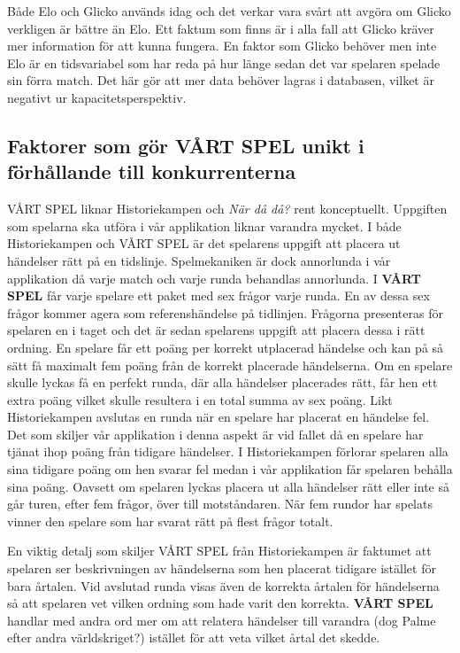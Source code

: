 \documentclass[a4paper, 11pt]{article}
\begin{document}
Både Elo och Glicko används idag och det verkar vara svårt att avgöra om Glicko verkligen är bättre än Elo\cite{stackchess}. Ett faktum som finns är i alla fall att Glicko kräver mer information för att kunna fungera. En faktor som Glicko behöver men inte Elo är en tidsvariabel som har reda på hur länge sedan det var spelaren spelade sin förra match\cite{glickoex}. Det här gör att mer data behöver lagras i databasen, vilket är negativt ur kapacitetsperspektiv.

\subsection{Faktorer som gör VÅRT SPEL unikt i förhållande till konkurrenterna}
VÅRT SPEL liknar Historiekampen och \textit{När då då?} rent konceptuellt. Uppgiften som spelarna ska utföra i vår applikation liknar varandra mycket. I både Historiekampen och VÅRT SPEL är det spelarens uppgift att placera ut händelser rätt på en tidslinje. Spelmekaniken är dock annorlunda i vår applikation då varje match och varje runda behandlas annorlunda. I \textbf{VÅRT SPEL} får varje spelare ett paket med sex frågor varje runda. En av dessa sex frågor kommer agera som referenshändelse på tidlinjen. Frågorna presenteras för spelaren en i taget och det är sedan spelarens uppgift att placera dessa i rätt ordning. En spelare får ett poäng per korrekt utplacerad händelse och kan på så sätt få maximalt fem poäng från de korrekt placerade händelserna. Om en spelare skulle lyckas få en perfekt runda, där alla händelser placerades rätt, får hen ett extra poäng vilket skulle resultera i en total summa av sex poäng. Likt Historiekampen avslutas en runda när en spelare har placerat en händelse fel. Det som skiljer vår applikation i denna aspekt är vid fallet då en spelare har tjänat ihop poäng från tidigare händelser. I Historiekampen förlorar spelaren alla sina tidigare poäng om hen svarar fel medan i vår applikation får spelaren behålla sina poäng. Oavsett om spelaren lyckas placera ut alla händelser rätt eller inte så går turen, efter fem frågor, över till motståndaren. När fem rundor har spelats vinner den spelare som har svarat rätt på flest frågor totalt.  

En viktig detalj som skiljer VÅRT SPEL från Historiekampen är faktumet att spelaren ser beskrivningen av händelserna som hen placerat tidigare istället för bara årtalen. Vid avslutad runda visas även de korrekta årtalen för händelserna så att spelaren vet vilken ordning som hade varit den korrekta. \textbf{VÅRT SPEL} handlar med andra ord mer om att relatera händelser till varandra (dog Palme efter andra världskriget?) istället för att veta vilket årtal det skedde.
\end{document}
